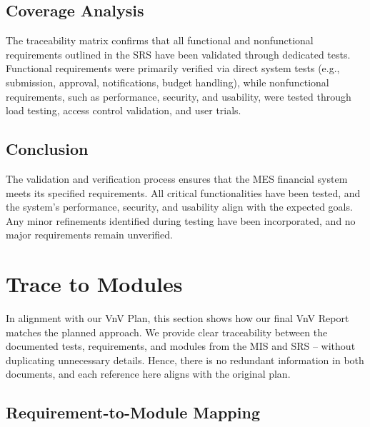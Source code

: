 \documentclass[12pt, titlepage]{article}
\begin{document}
\subsection{Coverage Analysis}

The traceability matrix confirms that all functional and nonfunctional requirements outlined in the SRS have been validated through dedicated tests. Functional requirements were primarily verified via direct system tests (e.g., submission, approval, notifications, budget handling), while nonfunctional requirements, such as performance, security, and usability, were tested through load testing, access control validation, and user trials.

\subsection{Conclusion}

The validation and verification process ensures that the MES financial system meets its specified requirements. All critical functionalities have been tested, and the system's performance, security, and usability align with the expected goals. Any minor refinements identified during testing have been incorporated, and no major requirements remain unverified.

		
\section{Trace to Modules}
\label{sec:TraceToModules}

In alignment with our VnV Plan, this section shows how our final VnV Report
matches the planned approach. We provide clear traceability between
the documented tests, requirements, and modules from the MIS and SRS –
without duplicating unnecessary details. Hence, there is no redundant
information in both documents, and each reference here aligns with the
original plan.

\subsection{Requirement-to-Module Mapping}
\end{document}
